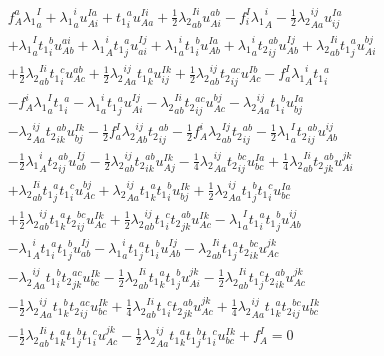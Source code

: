\begin{gather*}
f^{a}_{A} {\lambda_1}^{I}_{a}
+ {\lambda_1}^{i}_{a} u^{Ia}_{Ai}
+ {t_1}^{a}_{i} u^{Ii}_{Aa}
+ \frac{1}{2}{\lambda_2}^{Ii}_{ab} u^{ab}_{Ai}
- f^{I}_{i} {\lambda_1}^{i}_{A}
- \frac{1}{2}{\lambda_2}^{ij}_{Aa} u^{Ia}_{ij} \\
+ {\lambda_1}^{I}_{a}   {t_1}^{b}_{i} u^{ai}_{Ab}
+ {\lambda_1}^{i}_{A}   {t_1}^{a}_{j} u^{Ij}_{ai}
+ {\lambda_1}^{i}_{a}   {t_1}^{b}_{i} u^{Ia}_{Ab}
+ {\lambda_1}^{i}_{a}   {t_2}^{ab}_{ij} u^{Ij}_{Ab}
+ {\lambda_2}^{Ii}_{ab} {t_1}^{a}_{j} u^{bj}_{Ai} \\
+ \frac{1}{2}{\lambda_2}^{Ii}_{ab} {t_1}^{c}_{i} u^{ab}_{Ac}
+ \frac{1}{2}{\lambda_2}^{ij}_{Aa} {t_1}^{a}_{k} u^{Ik}_{ij}
+ \frac{1}{2}{\lambda_2}^{ij}_{ab} {t_2}^{ac}_{ij} u^{Ib}_{Ac}
- f^{I}_{a} {\lambda_1}^{i}_{A} {t_1}^{a}_{i} \\
- f^{i}_{A} {\lambda_1}^{I}_{a} {t_1}^{a}_{i}
- {\lambda_1}^{i}_{a}   {t_1}^{a}_{j} u^{Ij}_{Ai}
- {\lambda_2}^{Ii}_{ab} {t_2}^{ac}_{ij} u^{bj}_{Ac}
- {\lambda_2}^{ij}_{Aa} {t_1}^{b}_{i} u^{Ia}_{bj} \\
- {\lambda_2}^{ij}_{Aa} {t_2}^{ab}_{ik} u^{Ik}_{bj}
- \frac{1}{2}f^{I}_{a}   {\lambda_2}^{ij}_{Ab} {t_2}^{ab}_{ij}
- \frac{1}{2}f^{i}_{A}   {\lambda_2}^{Ij}_{ab} {t_2}^{ab}_{ij}
- \frac{1}{2}{\lambda_1}^{I}_{a} {t_2}^{ab}_{ij} u^{ij}_{Ab} \\
- \frac{1}{2}{\lambda_1}^{i}_{A} {t_2}^{ab}_{ij} u^{Ij}_{ab}
- \frac{1}{2}{\lambda_2}^{ij}_{ab} {t_2}^{ab}_{ik} u^{Ik}_{Aj}
- \frac{1}{4}{\lambda_2}^{ij}_{Aa} {t_2}^{bc}_{ij} u^{Ia}_{bc}
+ \frac{1}{4}{\lambda_2}^{Ii}_{ab} {t_2}^{ab}_{jk} u^{jk}_{Ai} \\
+ {\lambda_2}^{Ii}_{ab} {t_1}^{a}_{j} {t_1}^{c}_{i} u^{bj}_{Ac}
+ {\lambda_2}^{ij}_{Aa} {t_1}^{a}_{k} {t_1}^{b}_{i} u^{Ik}_{bj}
+ \frac{1}{2}{\lambda_2}^{ij}_{Aa} {t_1}^{b}_{j} {t_1}^{c}_{i} u^{Ia}_{bc} \\
+ \frac{1}{2}{\lambda_2}^{ij}_{ab} {t_1}^{a}_{k} {t_2}^{bc}_{ij} u^{Ik}_{Ac}
+ \frac{1}{2}{\lambda_2}^{ij}_{ab} {t_1}^{c}_{i} {t_2}^{ab}_{jk} u^{Ik}_{Ac}
- {\lambda_1}^{I}_{a}   {t_1}^{a}_{i} {t_1}^{b}_{j} u^{ij}_{Ab} \\
- {\lambda_1}^{i}_{A}   {t_1}^{a}_{i} {t_1}^{b}_{j} u^{Ij}_{ab}
- {\lambda_1}^{i}_{a}   {t_1}^{a}_{j} {t_1}^{b}_{i} u^{Ij}_{Ab}
- {\lambda_2}^{Ii}_{ab} {t_1}^{a}_{j} {t_2}^{bc}_{ik} u^{jk}_{Ac} \\
- {\lambda_2}^{ij}_{Aa} {t_1}^{b}_{i} {t_2}^{ac}_{jk} u^{Ik}_{bc}
- \frac{1}{2}{\lambda_2}^{Ii}_{ab} {t_1}^{a}_{k} {t_1}^{b}_{j} u^{jk}_{Ai}
- \frac{1}{2}{\lambda_2}^{Ii}_{ab} {t_1}^{c}_{j} {t_2}^{ab}_{ik} u^{jk}_{Ac} \\
- \frac{1}{2}{\lambda_2}^{ij}_{Aa} {t_1}^{b}_{k} {t_2}^{ac}_{ij} u^{Ik}_{bc}
+ \frac{1}{4}{\lambda_2}^{Ii}_{ab} {t_1}^{c}_{i} {t_2}^{ab}_{jk} u^{jk}_{Ac}
+ \frac{1}{4}{\lambda_2}^{ij}_{Aa} {t_1}^{a}_{k} {t_2}^{bc}_{ij} u^{Ik}_{bc} \\
- \frac{1}{2}{\lambda_2}^{Ii}_{ab} {t_1}^{a}_{k} {t_1}^{b}_{j} {t_1}^{c}_{i} u^{jk}_{Ac}
- \frac{1}{2}{\lambda_2}^{ij}_{Aa} {t_1}^{a}_{k} {t_1}^{b}_{j} {t_1}^{c}_{i} u^{Ik}_{bc}
+ f^{I}_{A} = 0
\end{gather*}

